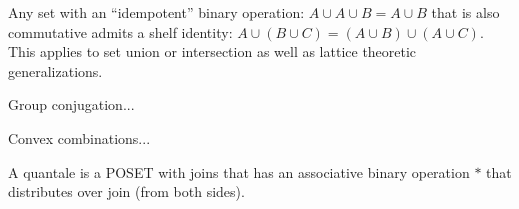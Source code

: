 \documentclass[11pt]{article}
\begin{document}
Any set with an ``idempotent'' binary operation: $A\cup A\cup B=A\cup B$
that is also commutative
admits a shelf identity: $A\cup (B\cup C) = (A\cup B)\cup(A\cup C).$
This applies to set union or intersection as well as
lattice theoretic generalizations.

Group conjugation...

Convex combinations...




A quantale is a POSET with joins that has an associative
binary operation $*$ that distributes over join (from both sides).

















{}

\end{document}
